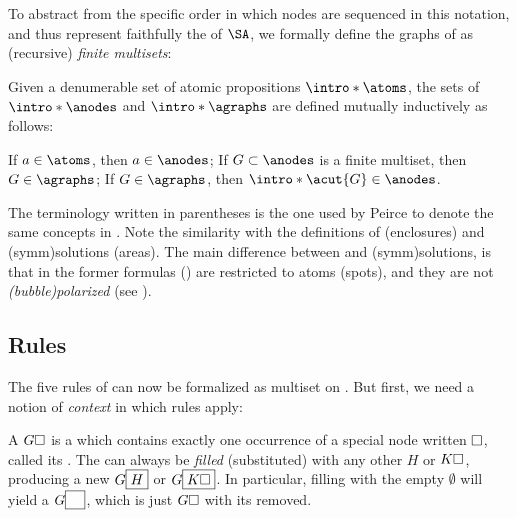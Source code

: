 \begin{scope}
\begin{example}
\end{example}

To abstract from the specific order in which nodes are sequenced in this
notation, and thus represent faithfully the  of $\SA$, we formally
define the graphs of  as (recursive) \emph{finite multisets}:

\begin{scope}

\begin{definition}[Graph] 
  \AP
  Given a denumerable set of atomic propositions $\intro*\atoms$, the sets of
   $\intro*\anodes$ and  $\intro*\agraphs$ are
  defined mutually inductively as follows:
  \begin{description}
    \itemAP[(Spot)] If $a \in \atoms$, then $a \in \anodes$;
    \itemAP[(Area)] If $G \subset \anodes$ is a finite multiset, then $G
    \in \agraphs$;
    \itemAP[(Enclosure)] If $G \in \agraphs$, then $\intro*\acut{G} \in
    \anodes$.
  \end{description}
\end{definition}
The terminology written in parentheses is the one used by Peirce to denote the
same concepts in . Note the similarity with
the definitions of  (enclosures) and \kl(symm){solutions} (areas).
The main difference between  and \kl(symm){solutions}, is that in the
former formulas () are restricted to atoms (spots), and they are not
\emph{\kl(bubble){polarized}} (see ).

\subsection{Rules}

The five rules of  can now be formalized as multiset 
on . But first, we need a notion of \emph{context} in which rules
apply:

\begin{definition}[Context]
  \AP
  A  $G\square$ is a  which contains exactly one
  occurrence of a special node written $\square$, called its . The
   can always be \emph{filled} (substituted) with any other 
  $H$ or  $K\square$, producing a new  $G\fbox{$H$}$ or 
  $G\fbox{$K\square$}$. In particular, filling with the empty 
  $\emptyset$ will yield a  $G\fbox{$\phantom{G}$}$, which is just
  $G\square$ with its  removed.
\end{definition}


\end{scope}
\end{scope}
